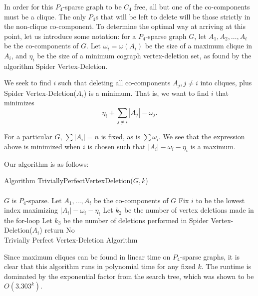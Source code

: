 \documentclass{llncs}
\begin{document}
In order for this $P_4$-sparse graph to be $C_4$ free, all but one of the co-components must be a clique. The only $P_4$s that will be left to delete will be those strictly in the non-clique co-component. To determine the optimal way at arriving at this point, let us introduce some notation: for a $P_4$-sparse graph $G$, let $A_1, A_2, \ldots , A_t$ be the co-components of $G$. Let $\omega_i = \omega(A_i)$ be the size of a maximum clique in $A_i$, and $\eta_i$ be the size of a minimum cograph vertex-deletion set, as found by the algorithm {\sc Spider Vertex-Deletion}.

We seek to find $i$ such that deleting all co-components $A_j, j\neq i$ into cliques, plus {\sc Spider Vertex-Deletion}($A_i$) is a minimum. That is, we want to find $i$ that minimizes
$$\eta_i + \sum_{j\neq i} |A_j|-\omega_j.$$

For a particular $G$, $\sum{|A_i|}=n$ is fixed, as is $\sum{\omega_i}$. We see that the expression above is minimized when $i$ is chosen such that $|A_i| - \omega_i - \eta_i$ is a maximum.

Our algorithm is as follows:

\begin{algorithm}[H]
\SetAlgoLined Algorithm {\sc TriviallyPerfectVertexDeletion($G,k$)}\\
\ \\
$G$ is $P_4$-sparse. Let $A_1, \ldots, A_t$ be the co-components of $G$\;
Fix $i$ to be the lowest index maximizing $|A_i| - \omega_i - \eta_i$\;
Let $k_2$ be the number of vertex deletions made in the for-loop\;
Let $k_3$ be the number of deletions performed in {\sc Spider Vertex-Deletion}($A_i$)\;
return {\sc No}\;
\ \\
\caption{Trivially Perfect Vertex-Deletion Algorithm}
\label{alg:TrivPerfVertex}
\end{algorithm}

Since maximum cliques can be found in linear time on $P_4$-sparse graphs, it is clear that this algorithm runs in polynomial time for any fixed $k$. The runtime is dominated by the exponential factor from the search tree, which was shown to be $O(3.303^k)$.
\end{document}
